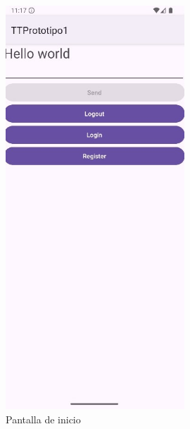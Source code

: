 \documentclass[a4paper,openright,12pt]{article}
\begin{document}
\begin{figure}[htp]
    \centering
    \begin{minipage}{0.4\textwidth}
        \centering
        \includegraphics[width=0.6\textwidth]{Images/Vista_It1.jpg} 
        \caption{Pantalla de inicio}
        \label{fig:Pantalla de inicio}
    \end{minipage}
    \hfill
    \begin{minipage}{0.4\textwidth}
        \centering

\end{minipage}
\end{figure}
\end{document}

